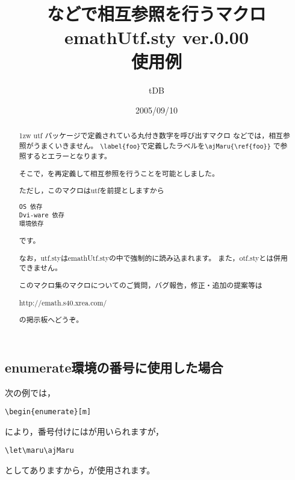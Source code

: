 \documentclass[a4j]{jarticle}
\begin{document}
\title{などで相互参照を行うマクロ\\
emathUtf.sty {\normalsize ver.0.00}\\使用例}
\author{tDB}
\date{2005/09/10}

\maketitle\thispagestyle{empty}
\begin{abstract}%
\parindent1zw%
utf パッケージで定義されている丸付き数字を呼び出すマクロ
などでは，相互参照がうまくいきません。
\verb+\label{foo}+で定義したラベルを\verb+\ajMaru{\ref{foo}}+
で参照するとエラーとなります。

そこで，を再定義して相互参照を行うことを可能としました。

ただし，このマクロは\textsf{utf}を前提としますから
\begin{jquote}
\begin{verbatim}
OS 依存
Dvi-ware 依存
環境依存
\end{verbatim}
\end{jquote}
です。

なお，\textsf{utf.sty}は\textsf{emathUtf.sty}の中で強制的に読み込まれます。
また，\textsf{otf.sty}とは併用できません。
\bigskip

このマクロ集のマクロについてのご質問，バグ報告，修正・追加の提案等は
\begin{center}
http://emath.s40.xrea.com/
\end{center}
の掲示板へどうぞ。
\end{abstract}

\tableofcontents

\pagebreak


\section{}
\subsection{enumerate環境の番号に使用した場合}
次の例では，
\begin{jquote}
\begin{verbatim}
\begin{enumerate}[m]
\end{verbatim}
\end{jquote}
により，番号付けにはが用いられますが，
\begin{jquote}
\begin{verbatim}
\let\maru\ajMaru
\end{verbatim}
\end{jquote}
としてありますから，が使用されます。
\end{document}
